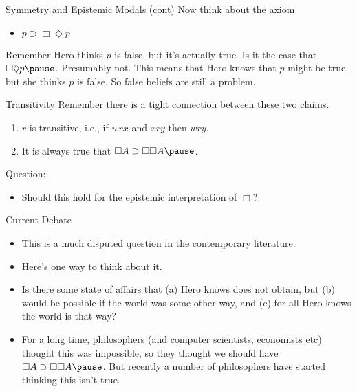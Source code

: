 \documentclass[
  14pt,
  letterpaper,
  ignorenonframetext,
  handout]{beamer}
\providecommand{\tightlist}{%
  \setlength{\itemsep}{0pt}\setlength{\parskip}{0pt}}\usepackage{longtable,booktabs,array}
\begin{document}
\begin{frame}{Symmetry and Epistemic Modals (cont)}
\protect\hypertarget{symmetry-and-epistemic-modals-cont}{}
Now think about the axiom

\begin{itemize}
\tightlist
\item
  \(p \supset \Box \Diamond p\)
\end{itemize}

Remember Hero thinks \(p\) is false, but it's actually true. Is it the
case that \(\Box \Diamond p \pause\). Presumably not. This means that
Hero knows that \(p\) might be true, but she thinks \(p\) is false. So
false beliefs are still a problem.
\end{frame}

\begin{frame}{Transitivity}
\protect\hypertarget{transitivity}{}
Remember there is a tight connection between these two claims.

\begin{enumerate}
\tightlist
\item
  \(r\) is transitive, i.e., if \(wrx\) and \(xry\) then \(wry\).
\item
  It is always true that \(\Box A \supset \Box \Box A \pause\).
\end{enumerate}

Question:

\begin{itemize}
\tightlist
\item
  Should this hold for the epistemic interpretation of \(\Box\)?
\end{itemize}
\end{frame}

\begin{frame}{Current Debate}
\protect\hypertarget{current-debate}{}
\begin{itemize}
\tightlist
\item
  This is a much disputed question in the contemporary literature.
\item
  Here's one way to think about it.
\item
  Is there some state of affairs that (a) Hero knows does not obtain,
  but (b) would be possible if the world was some other way, and (c) for
  all Hero knows the world is that way? \pause
\item
  For a long time, philosophers (and computer scientists, economists
  etc) thought this was impossible, so they thought we should have
  \(\Box A \supset \Box \Box A \pause\). But recently a number of
  philosophers have started thinking this isn't true.
\end{itemize}
\end{frame}
\end{document}
